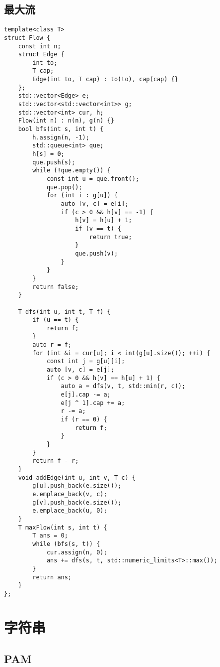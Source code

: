 \documentclass[a4paper,10pt]{article}
\begin{document}
\subsection{最大流}
\thispagestyle{fancy}

\noindent\begin{lstlisting}
template<class T>
struct Flow {
    const int n;
    struct Edge {
        int to;
        T cap;
        Edge(int to, T cap) : to(to), cap(cap) {}
    };
    std::vector<Edge> e;
    std::vector<std::vector<int>> g;
    std::vector<int> cur, h;
    Flow(int n) : n(n), g(n) {}
    bool bfs(int s, int t) {
        h.assign(n, -1);
        std::queue<int> que;
        h[s] = 0;
        que.push(s);
        while (!que.empty()) {
            const int u = que.front();
            que.pop();
            for (int i : g[u]) {
                auto [v, c] = e[i];
                if (c > 0 && h[v] == -1) {
                    h[v] = h[u] + 1;
                    if (v == t) {
                        return true;
                    }
                    que.push(v);
                }
            }
        }
        return false;
    }

    T dfs(int u, int t, T f) {
        if (u == t) {
            return f;
        }
        auto r = f;
        for (int &i = cur[u]; i < int(g[u].size()); ++i) {
            const int j = g[u][i];
            auto [v, c] = e[j];
            if (c > 0 && h[v] == h[u] + 1) {
                auto a = dfs(v, t, std::min(r, c));
                e[j].cap -= a;
                e[j ^ 1].cap += a;
                r -= a;
                if (r == 0) {
                    return f;
                }
            }
        }
        return f - r;
    }
    void addEdge(int u, int v, T c) {
        g[u].push_back(e.size());
        e.emplace_back(v, c);
        g[v].push_back(e.size());
        e.emplace_back(u, 0);
    }
    T maxFlow(int s, int t) {
        T ans = 0;
        while (bfs(s, t)) {
            cur.assign(n, 0);
            ans += dfs(s, t, std::numeric_limits<T>::max());
        }
        return ans;
    }
};\end{lstlisting}

\section{字符串}
\thispagestyle{fancy}

\subsection{PAM}
\thispagestyle{fancy}
\end{document}
